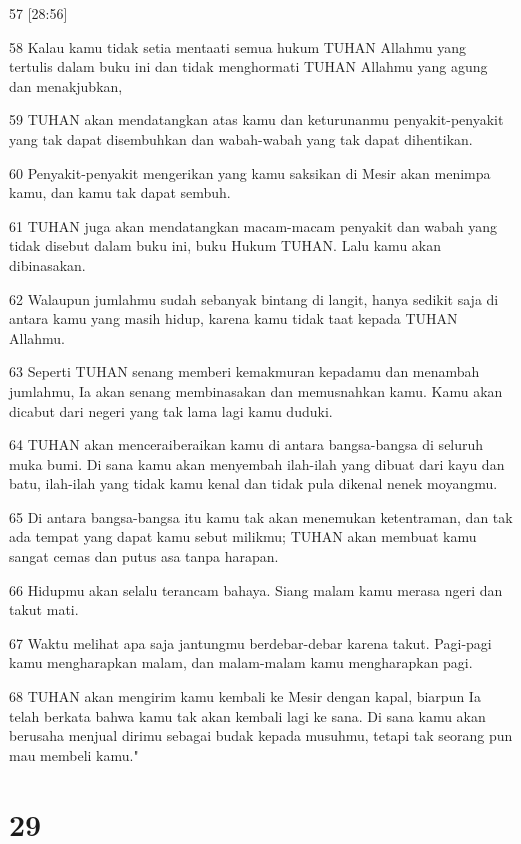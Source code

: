 \par 57 [28:56]
\par 58 Kalau kamu tidak setia mentaati semua hukum TUHAN Allahmu yang tertulis dalam buku ini dan tidak menghormati TUHAN Allahmu yang agung dan menakjubkan,
\par 59 TUHAN akan mendatangkan atas kamu dan keturunanmu penyakit-penyakit yang tak dapat disembuhkan dan wabah-wabah yang tak dapat dihentikan.
\par 60 Penyakit-penyakit mengerikan yang kamu saksikan di Mesir akan menimpa kamu, dan kamu tak dapat sembuh.
\par 61 TUHAN juga akan mendatangkan macam-macam penyakit dan wabah yang tidak disebut dalam buku ini, buku Hukum TUHAN. Lalu kamu akan dibinasakan.
\par 62 Walaupun jumlahmu sudah sebanyak bintang di langit, hanya sedikit saja di antara kamu yang masih hidup, karena kamu tidak taat kepada TUHAN Allahmu.
\par 63 Seperti TUHAN senang memberi kemakmuran kepadamu dan menambah jumlahmu, Ia akan senang membinasakan dan memusnahkan kamu. Kamu akan dicabut dari negeri yang tak lama lagi kamu duduki.
\par 64 TUHAN akan menceraiberaikan kamu di antara bangsa-bangsa di seluruh muka bumi. Di sana kamu akan menyembah ilah-ilah yang dibuat dari kayu dan batu, ilah-ilah yang tidak kamu kenal dan tidak pula dikenal nenek moyangmu.
\par 65 Di antara bangsa-bangsa itu kamu tak akan menemukan ketentraman, dan tak ada tempat yang dapat kamu sebut milikmu; TUHAN akan membuat kamu sangat cemas dan putus asa tanpa harapan.
\par 66 Hidupmu akan selalu terancam bahaya. Siang malam kamu merasa ngeri dan takut mati.
\par 67 Waktu melihat apa saja jantungmu berdebar-debar karena takut. Pagi-pagi kamu mengharapkan malam, dan malam-malam kamu mengharapkan pagi.
\par 68 TUHAN akan mengirim kamu kembali ke Mesir dengan kapal, biarpun Ia telah berkata bahwa kamu tak akan kembali lagi ke sana. Di sana kamu akan berusaha menjual dirimu sebagai budak kepada musuhmu, tetapi tak seorang pun mau membeli kamu."

\chapter{29}

